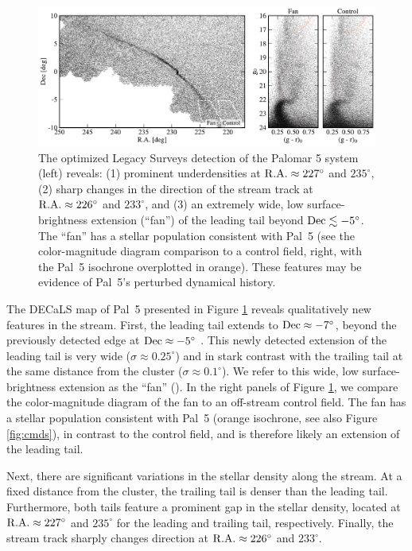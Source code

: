 \documentclass[twocolumn]{aastex62}
\begin{document}
\begin{figure}
\begin{center}
\includegraphics[width=\textwidth]{map_fancmd.pdf}
\end{center}
\caption{
The optimized Legacy Surveys detection of the Palomar 5 system (left) reveals: (1) prominent underdensities at $\rm R.A.\approx 227^\circ$ and $235^\circ$, (2) sharp changes in the direction of the stream track at $\rm R.A.\approx 226^\circ$ and $233^\circ$, and (3) an extremely wide, low surface-brightness extension (``fan'') of the leading tail beyond $\rm Dec\lesssim-5^\circ$.
The ``fan''  has a stellar population consistent with Pal~5 (see the color-magnitude diagram comparison to a control field, right, with the Pal~5 isochrone overplotted in orange).
These features may be evidence of Pal~5's perturbed dynamical history.
}
\label{fig:map}
\end{figure}

The DECaLS map of Pal~5 presented in Figure \ref{fig:map} reveals qualitatively new features in the stream.
First, the leading tail extends to $\rm Dec\approx-7^\circ$, beyond the previously detected edge at $\rm Dec\approx -5^\circ$ \citep{Bernard:2016}.
This newly detected extension of the leading tail is very wide ($\sigma\approx 0.25^\circ$) and in stark contrast with the trailing tail at the same distance from the cluster ($\sigma\approx 0.1^\circ$). We refer to this wide, low surface-brightness extension as the ``fan'' (\citealt{Pearson:2015}).
In the right panels of Figure \ref{fig:map}, we compare the color-magnitude diagram of the fan to an off-stream control field.
The fan has a stellar population consistent with Pal~5 (orange isochrone, see also Figure \ref{fig:cmds}), in contrast to the control field, and is therefore likely an extension of the leading tail.

Next, there are significant variations in the stellar density along the stream.
At a fixed distance from the cluster, the trailing tail is denser than the leading tail.
Furthermore, both tails feature a prominent gap in the stellar density, located at $\rm R.A.\approx 227^\circ$ and $235^\circ$ for the leading and trailing tail, respectively.
Finally, the stream track sharply changes direction at $\rm R.A.\approx 226^\circ$ and $233^\circ$.
\end{document}
